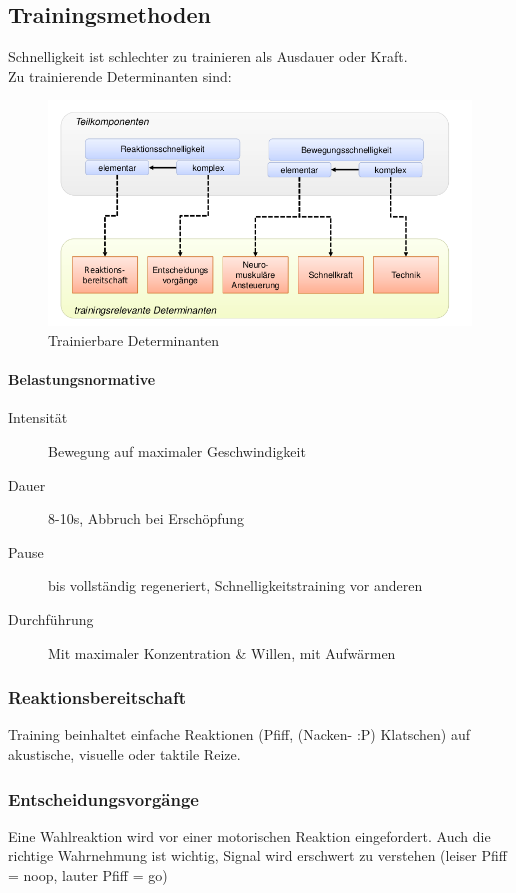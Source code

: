 \subsection{Trainingsmethoden}
Schnelligkeit ist schlechter zu trainieren als Ausdauer oder Kraft.\\
Zu trainierende Determinanten sind:
\begin{figure}[H]
    \centering
    \includegraphics[width=.7\textwidth]{pictures/schnelligkeit_trainierbare_determinanten.png}
    \caption{Trainierbare Determinanten}
\end{figure}

\paragraph{Belastungsnormative}
\begin{description}
    \item[Intensität] Bewegung auf maximaler Geschwindigkeit
    \item[Dauer] 8-10s, Abbruch bei Erschöpfung
    \item[Pause] bis vollständig regeneriert, Schnelligkeitstraining vor anderen
    \item[Durchführung] Mit maximaler Konzentration \& Willen, mit Aufwärmen
\end{description}

\subsubsection{Reaktionsbereitschaft}
Training beinhaltet einfache Reaktionen (Pfiff, (Nacken- :P) Klatschen) auf akustische, visuelle oder taktile Reize.

\subsubsection{Entscheidungsvorgänge}
Eine Wahlreaktion wird vor einer motorischen Reaktion eingefordert.
Auch die richtige Wahrnehmung ist wichtig, Signal wird erschwert zu verstehen (leiser Pfiff = noop, lauter Pfiff = go)

